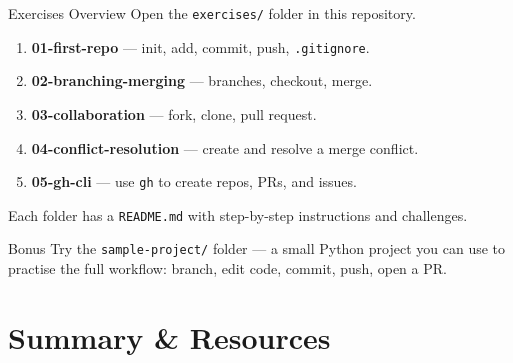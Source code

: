 \documentclass[aspectratio=169, 11pt]{beamer}
\begin{document}
\begin{frame}{Exercises Overview}
  Open the \texttt{exercises/} folder in this repository.

  \begin{enumerate}
    \item \textbf{01-first-repo} --- init, add, commit, push, \texttt{.gitignore}.
    \item \textbf{02-branching-merging} --- branches, checkout, merge.
    \item \textbf{03-collaboration} --- fork, clone, pull request.
    \item \textbf{04-conflict-resolution} --- create and resolve a merge conflict.
    \item \textbf{05-gh-cli} --- use \texttt{gh} to create repos, PRs, and issues.
  \end{enumerate}

  \vspace{0.5em}
  Each folder has a \texttt{README.md} with step-by-step instructions and challenges.

  \vspace{0.5em}
  \begin{block}{Bonus}
    Try the \texttt{sample-project/} folder --- a small Python project you can use to practise the full workflow: branch, edit code, commit, push, open a PR.
  \end{block}
\end{frame}

\section{Summary \& Resources}
\end{document}

